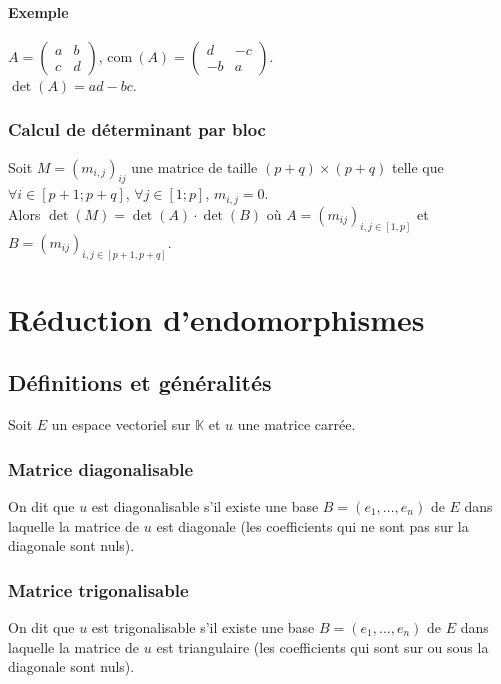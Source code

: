 \documentclass[a4paper,10pt]{book} %
\newcommand{\K}{\mathbb{K}}
\newcommand{\ev}{espace vectoriel }
\newcommand{\com}{\mathrm{com}~} %
\begin{document}
\subsubsection{Exemple}
$A=\begin{pmatrix}
a&b\\c&d
\end{pmatrix}$, $\com(A)=\begin{pmatrix}
d&-c\\-b&a
\end{pmatrix}$.\\

$\det(A)=ad-bc$.

\subsection{Calcul de déterminant par bloc}
Soit $M=(m_{i,j})_{ij}$ une matrice de taille $(p+q)\times (p+q)$ telle que\\
$\forall i\in [p+1;p+q]$, $\forall j\in [1;p]$, $m_{i,j}=0$.\\

Alors $\det (M)=\det(A)\cdot \det(B)$ où $A=(m_{ij})_{i,j\in [1,p]}$ et $B=(m_{ij})_{i,j\in [p+1,p+q]}$.


\chapter{Réduction d'endomorphismes}
\section{Définitions et généralités}
Soit $E$ un \ev sur $\K$ et $u$ une matrice carrée.

\subsection{Matrice diagonalisable}
On dit que $u$ est diagonalisable s'il existe une base $B=(e_1,...,e_n)$ de $E$ dans laquelle la matrice de $u$ est diagonale (les coefficients qui ne sont pas sur la diagonale sont nuls).

\subsection{Matrice trigonalisable}
On dit que $u$ est trigonalisable s'il existe une base $B=(e_1,...,e_n)$ de $E$ dans laquelle la matrice de $u$ est triangulaire (les coefficients qui sont sur ou sous la diagonale sont nuls).
\end{document}
